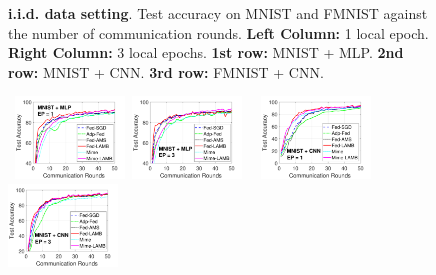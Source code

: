 \documentclass[nohyperref]{article}
\theoremstyle{plain}
\theoremstyle{definition}
\theoremstyle{remark}
\begin{document}
\begin{figure}[t]
\begin{center}
{        }
    \end{center}
    \vspace{0.1in}
	\caption{\textbf{i.i.d. data setting}. Test accuracy on MNIST and FMNIST against the number of communication rounds. \textbf{Left Column:} 1 local epoch. \textbf{Right Column:} 3 local epochs. \textbf{1st row:} MNIST + MLP. \textbf{2nd row:} MNIST + CNN. \textbf{3rd row:} FMNIST + CNN. 
	}
	\label{fig:iid}\vspace{-0.2in}
\end{figure}

\begin{figure}[t]

    \vspace{-0.15in}
    \begin{center}
        \mbox{
        \hspace{-0.1in}\includegraphics[width=0.26\textwidth]{figure_mime/mnist_testerror_mlp_ep1_iid0_mime.pdf}
        \hspace{-0.1in}\includegraphics[width=0.26\textwidth]{figure_mime/mnist_testerror_mlp_ep3_iid0_mime.pdf}
                }
        \mbox{
        \hspace{-0.1in}\includegraphics[width=0.26\textwidth]{figure_mime/mnist_testerror_cnn_ep1_iid0_mime.pdf}
        \hspace{-0.1in}\includegraphics[width=0.26\textwidth]{figure_mime/mnist_testerror_cnn_ep3_iid0_mime.pdf}
}
\end{center}
\end{figure}
\end{document}
